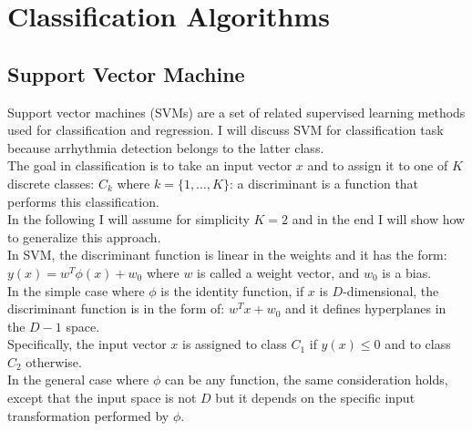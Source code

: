 \documentclass[LaM,binding=0.6cm]{sapthesis}
\begin{document}
%

\chapter{Classification Algorithms}

\section{Support Vector Machine}
Support vector machines (SVMs) are a set of related supervised learning methods used for classification and regression.
I will discuss SVM for classification task because arrhythmia detection belongs to the latter class.\\The goal in classification is to take an input vector $x$ and to assign it to one of $K$ discrete classes: $C_k$ where $k = \{1,\dots,K\}$: a discriminant is a function that performs this classification.\\In the following I will assume for simplicity $K=2$ and in the end I will show how to generalize this approach.\\In SVM, the discriminant function is linear in the weights and it has the form: $y(x)= w^T\phi(x)+w_0 $ where $w$ is called a weight vector, and $w_0$ is a bias.\\In the simple case where $\phi$ is the identity function, if $x$ is $D$-dimensional, the discriminant function is in the form of: $w^Tx+w_0 $ and it defines hyperplanes in the $D-1$ space.\\Specifically, the input vector $x$ is assigned to class $C_1$ if $y(x)\leq0$ and to class $C_2$ otherwise.\\In the general case where $\phi$ can be any function, the same consideration holds, except that the input space is not $D$ but it depends on the specific input transformation performed by $\phi$.
\end{document}
